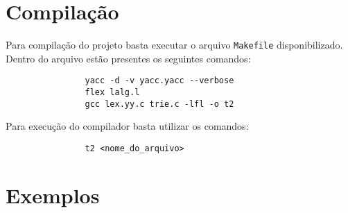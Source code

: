 \documentclass {article}
\begin{document}
\section{Compilação}\label{section:compilacao}
	Para compilação do projeto basta executar o arquivo \verb=Makefile= disponibilizado. Dentro do arquivo estão presentes os seguintes comandos:

	\begin{center}
		\begin{minipage}[ht]{0.5\textwidth}
			\begin{verbatim}
				yacc -d -v yacc.yacc --verbose 
				flex lalg.l
				gcc lex.yy.c trie.c -lfl -o t2
			\end{verbatim}
		\end{minipage}
	\end{center}

	Para execução do compilador basta utilizar os comandos:

	\begin{center}
		\begin{minipage}[ht]{0.5\textwidth}
			\begin{verbatim}
				t2 <nome_do_arquivo>
			\end{verbatim}
		\end{minipage}
	\end{center}
	
\section{Exemplos}\label{section:exemplos}
\end{document}

